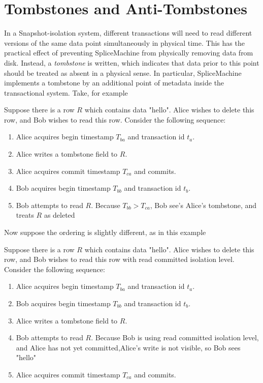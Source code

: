\section{Tombstones and Anti-Tombstones}
In a Snapshot-isolation system, different transactions will need to read different versions of the same data point simultaneously in physical time. This has the practical effect of preventing SpliceMachine from physically removing data from disk. Instead, a \emph{tombstone} is written, which indicates that data prior to this point should be treated as absent in a physical sense. In particular, SpliceMachine implements a tombstone by an additional point of metadata inside the transactional system. Take, for example

\begin{exmp}
	Suppose there is a row $R$ which contains data "hello". Alice wishes to delete this row, and Bob wishes to read this row. Consider the following sequence:

	\begin{enumerate}
		\item Alice acquires begin timestamp $T_{ba}$ and transaction id $t_a$.
		\item Alice writes a tombstone field to $R$.
		\item Alice acquires commit timestamp $T_{ca}$ and commits.
		\item Bob acquires begin timestamp $T_{bb}$ and transaction id $t_b$.
		\item Bob attempts to read $R$. Because $T_{bb} > T_{ca}$, Bob see's Alice's tombstone, and treats $R$ as deleted
	\end{enumerate}
\end{exmp}

Now suppose the ordering is slightly different, as in this example

\begin{exmp}
	Suppose there is a row $R$ which contains data "hello". Alice wishes to delete this row, and Bob wishes to read this row with read committed isolation level. Consider the following sequence:

	\begin{enumerate}
		\item Alice acquires begin timestamp $T_{ba}$ and transaction id $t_a$.
		\item Bob acquires begin timestamp $T_{bb}$ and transaction id $t_b$.
		\item Alice writes a tombstone field to $R$.
		\item Bob attempts to read $R$. Because Bob is using read committed isolation level, and Alice has not yet committed,Alice's write is not visible, so Bob sees "hello"
		\item Alice acquires commit timestamp $T_{ca}$ and commits.
	\end{enumerate}
\end{exmp}


